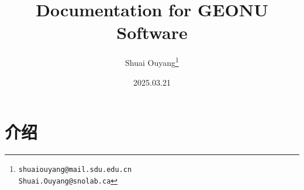 
\usepackage{ctex}
\usepackage{multirow}  %
\usepackage{booktabs}  %

\title{\textbf{Documentation for GEONU Software}}
\author{Shuai Ouyang\thanks{\parbox[t]{4.5cm}{%
			\texttt{shuaiouyang@mail.sdu.edu.cn} \\ 
			\texttt{Shuai.Ouyang@snolab.ca}}}}
\date{2025.03.21}


	\maketitle							%
	\thispagestyle{empty}				%
	\frontmatter						%
	\cleardoublepage				 	%
	\tableofcontents				  	%
	\mainmatter							%
	\chapter{介绍}
